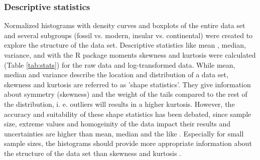 



\subsubsection{Descriptive statistics}
Normalized histograms with density curves and boxplots of the entire data set and several subgroups (fossil vs. modern, insular vs. continental) were created to explore the structure of the data set. Descriptive statistics like mean , median, variance, and with the R package moments \citep{Komsta2015} skewness and kurtosis were calculated (Table \ref{tab:stats}) for the raw data and log-transformed data. While mean, median and variance describe the location and distribution of a data set, skewness and kurtosis are referred to as 'shape statistics'. They give information about symmetry (skewness) and the weight of the tails compared to the rest of the distribution, i. e. outliers will results in a higher kurtosis. However, the accuracy and suitability of these shape statistics has been debated, since sample size, extreme values and homogeinity of the data impact their results and uncertainties are higher than mean, median and the like \citep{McNeese2016, Bai2005}. Especially for small sample sizes, the histograms should provide more appropriate information about the structure of the data set than skewness and kurtosis \citep{McNeese2016}.

